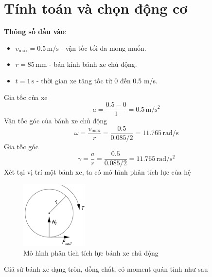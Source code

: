     \section{Tính toán và chọn động cơ}
        \hspace*{0.6cm}\textbf{Thông số đầu vào}:
        \begin{itemize}
            \item $v_{\text{max}} = 0.5 \,\mathrm{m/s}$ - vận tốc tối đa mong muốn.
            \item $r = 85 \,\mathrm{mm}$ - bán kính bánh xe chủ động.
            \item $t = 1 \,\mathrm{s}$ - thời gian xe tăng tốc từ 0 đến 0.5 m/s.
        \end{itemize}
        \hspace*{0.6cm}Gia tốc của xe
        \begin{equation*}
            a = \dfrac{0.5 - 0}{1} = 0.5 \,\mathrm{m/s^2}
        \end{equation*}
        \hspace{0.6cm}Vận tốc góc của bánh xe chủ động
        \begin{equation*}
            \omega = \dfrac{v_{\text{max}}}{r} = \dfrac{0.5}{0.085/2} = 11.765 \,\mathrm{rad/s}
        \end{equation*}
        \hspace*{0.6cm}Gia tốc góc
        \begin{equation*}
            \gamma = \frac{a}{r} = \dfrac{0.5}{0.085/2} = 11.765 \,\mathrm{rad/s^2}
        \end{equation*}
        \hspace*{0.6cm}Xét tại vị trí một bánh xe, ta có mô hình phân tích lực của hệ\\
        \begin{figure}[H]
            \centering
            \includegraphics[width=0.3\textwidth]{pictures/chapter3/banhxe.png}
            \caption{Mô hình phân tích tích lực bánh xe chủ động}
            \label{phantich_banhxe}
        \end{figure}
        \hspace*{0.6cm}Giả sử bánh xe dạng tròn, đồng chất, có moment quán tính như sau
